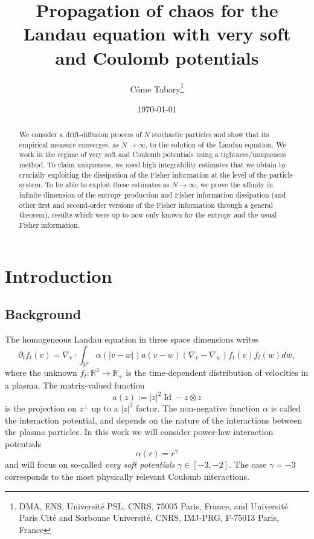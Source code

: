 \documentclass[11pt,a4paper]{article}
\title{Propagation of chaos for the Landau equation with very soft and Coulomb potentials}
\date{\today}
\author{Côme Tabary\footnote{DMA, ENS, Université PSL, CNRS, 75005 Paris, France, and Université Paris Cité and Sorbonne Université, CNRS, IMJ-PRG, F-75013 Paris, France}}
\theoremstyle{definition}
\theoremstyle{plain}
\DeclareMathOperator*{\Id}{Id}
\begin{document}
\maketitle

\begin{abstract}
\noindent We consider a drift-diffusion process of $N$ stochastic particles and show that its empirical measure converges, as $N\rightarrow\infty$, to the solution of the Landau equation. We work in the regime of very soft and Coulomb potentials using a tightness/uniqueness method. To claim uniqueness, we need high integrability estimates that we obtain by crucially exploiting the dissipation of the Fisher information at the level of the particle system. To be able to exploit these estimates as $N\rightarrow\infty$, we prove the affinity in infinite dimension of the entropy production and Fisher information dissipation (and other first and second-order versions of the Fisher information through a general theorem), results which were up to now only known for the entropy and the usual Fisher information.
\end{abstract}

\setcounter{tocdepth}{1}
\tableofcontents

\section{Introduction}

\subsection{Background}

The homogeneous Landau equation in three space dimensions writes
\begin{equation}
\label{eq:landau}
    \partial_t f_t(v) = \nabla_v \cdot \int_{\mathbb{R}^3} \alpha(\vert v-w \vert) a (v - w) (\nabla_v - \nabla_w) f_t(v)f_t(w) dw,
\end{equation}
where the unknown $f_t:\mathbb{R}^3\rightarrow\mathbb{R}_+$ is the time-dependent distribution of velocities in a plasma.
The matrix-valued function
$$a(z):=\vert z \vert^2 \Id - z \otimes z$$
is the projection on $z^{\perp}$ up to a $\vert z \vert^2$ factor. The non-negative function $\alpha$ is called the interaction potential, and depends on the nature of the interactions between the plasma particles. In this work we will consider power-law interaction potentials 
$$\alpha(r)=r^\gamma$$
and will focus on so-called \textit{very soft potentials} $\gamma\in[-3,-2]$. The case $\gamma=-3$ corresponds to the most physically relevant Coulomb interactions.
\end{document}
